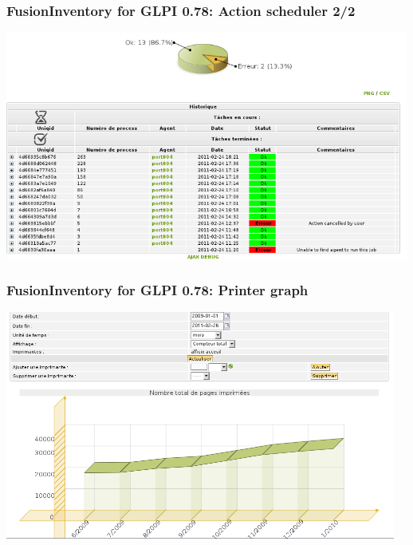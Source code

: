 \documentclass{beamer}
\begin{document}
\begin{frame}
\frametitle{FusionInventory for GLPI 0.78: Action scheduler 2/2}
    \includegraphics[height=7.5cm]{pics/walid_task_1.png}
\end{frame}

\begin{frame}
\frametitle{FusionInventory for GLPI 0.78: Printer graph}
    \includegraphics[height=7.5cm]{pics/walid_printer_2.png}
\end{frame}
%
\end{document}
